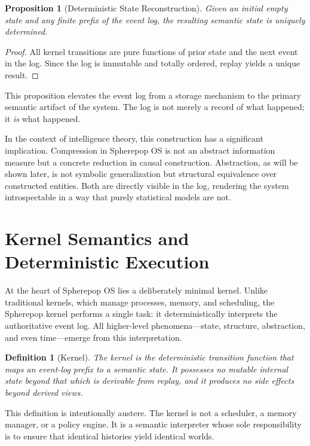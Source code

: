 \documentclass[11pt]{article}
\newtheorem{definition}{Definition}[section]
\newtheorem{proposition}{Proposition}[section]
\begin{document}
\begin{proposition}[Deterministic State Reconstruction]
Given an initial empty state and any finite prefix of the event log, the
resulting semantic state is uniquely determined.
\end{proposition}

\begin{proof}
All kernel transitions are pure functions of prior state and the next event
in the log. Since the log is immutable and totally ordered, replay yields a
unique result.
\end{proof}

This proposition elevates the event log from a storage mechanism to the
primary semantic artifact of the system. The log is not merely a record of
what happened; it \emph{is} what happened.

In the context of intelligence theory, this construction has a significant
implication. Compression in Spherepop OS is not an abstract information
measure but a concrete reduction in causal construction. Abstraction, as
will be shown later, is not symbolic generalization but structural
equivalence over constructed entities. Both are directly visible in the
log, rendering the system introspectable in a way that purely statistical
models are not.

\section{Kernel Semantics and Deterministic Execution}

At the heart of Spherepop OS lies a deliberately minimal kernel. Unlike
traditional kernels, which manage processes, memory, and scheduling, the
Spherepop kernel performs a single task: it deterministically interprets the
authoritative event log. All higher-level phenomena—state, structure,
abstraction, and even time—emerge from this interpretation.

\begin{definition}[Kernel]
The kernel is the deterministic transition function that maps an event-log
prefix to a semantic state. It possesses no mutable internal state beyond
that which is derivable from replay, and it produces no side effects beyond
derived views.
\end{definition}

This definition is intentionally austere. The kernel is not a scheduler, a
memory manager, or a policy engine. It is a semantic interpreter whose sole
responsibility is to ensure that identical histories yield identical worlds.
\end{document}
